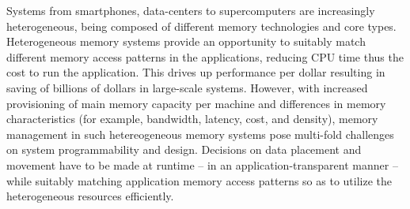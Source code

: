 
Systems from smartphones, data-centers to supercomputers are increasingly
heterogeneous, being composed of different memory technologies and core types.
Heterogeneous memory systems provide an opportunity to suitably match different
memory access patterns in the applications, reducing CPU time thus the cost to
run the application. This drives up performance per dollar resulting in saving
of billions of dollars in large-scale systems.  However, with increased
provisioning of main memory capacity per machine and differences in memory
characteristics (for example, bandwidth, latency, cost, and density), memory
management in such hetereogeneous memory systems pose multi-fold challenges on
system programmability and design. Decisions on data placement and movement have
to be made at runtime -- in an application-transparent manner --
while suitably matching application memory access patterns so as to utilize the
heterogeneous resources efficiently.

